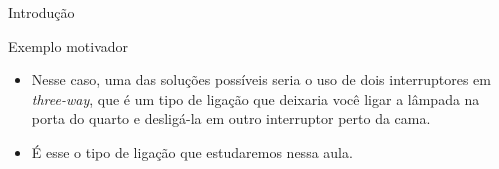 \begin{frame}{Introdução}
	\begin{block}{Exemplo motivador}
		\begin{itemize}
			\item Nesse caso, uma das soluções possíveis seria o uso de dois interruptores em \textit{three-way}, que é um tipo de ligação que deixaria você ligar a lâmpada na porta do quarto e desligá-la em outro interruptor perto da cama.
			\item É esse o tipo de ligação que estudaremos nessa aula.
		\end{itemize}
	\end{block}

\end{frame}


